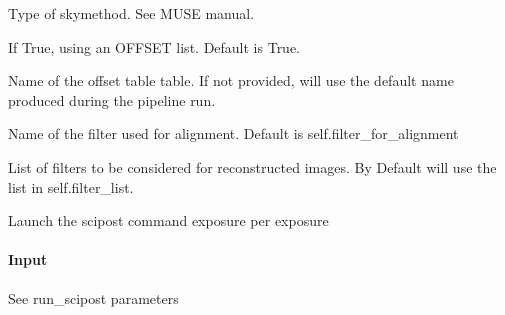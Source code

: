 \documentclass[letterpaper,10pt,english]{sphinxmanual}
\begin{document}
\begin{fulllineitems}
\begin{fulllineitems}
\begin{description}
\sphinxAtStartPar
Type of skymethod. See MUSE manual.

\sphinxAtStartPar
If True, using an OFFSET list. Default is True.

\sphinxAtStartPar
Name of the offset table table. If not provided, will use the
default name produced during the pipeline run.

\sphinxAtStartPar
Name of the filter used for alignment.
Default is self.filter\_for\_alignment

\sphinxAtStartPar
List of filters to be considered for reconstructed images.
By Default will use the list in self.filter\_list.

\end{description}

\end{fulllineitems}


\begin{fulllineitems}
\label{\detokenize{api/pymusepipe:pymusepipe.prep_recipes_pipe.PipePrep.run_scipost_perexpo}}
\pysigstartsignatures
{}
\pysigstopsignatures
\sphinxAtStartPar
Launch the scipost command exposure per exposure


\paragraph{Input}
\label{\detokenize{api/pymusepipe:id108}}
\sphinxAtStartPar
See run\_scipost parameters


\end{fulllineitems}
\end{fulllineitems}
\end{document}
